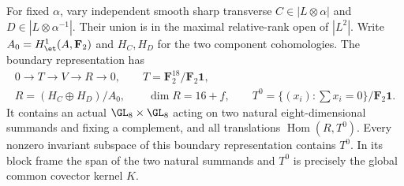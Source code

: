 \begin{lemma}
\label{lem:nonordinary-ppav-two-boundary-gluing-candidate}
For fixed $\alpha$, vary independent smooth sharp transverse
$C\in|L\otimes\alpha|$ and $D\in|L\otimes\alpha^{-1}|$.
Their union is in the maximal relative-rank open of $|L^2|$.
Write $A_0=H^1_{\et}(A,\mathbf F_2)$ and $H_C,H_D$ for the two
component cohomologies. The boundary representation has
\[
 \begin{gathered}
 0\longrightarrow T\longrightarrow V\longrightarrow R\longrightarrow0,
 \qquad T=\mathbf F_2^{18}/\mathbf F_2\mathbf1,\\
 R=(H_C\oplus H_D)/A_0,
 \qquad \dim R=16+f,\qquad
 T^0=\{(x_i):\sum x_i=0\}/\mathbf F_2\mathbf1.
 \end{gathered}
\]
It contains an actual $\GL_8\times\GL_8$ acting on two natural
eight-dimensional summands and fixing a complement, and all
translations $\operatorname{Hom}(R,T^0)$. Every nonzero invariant
subspace of this boundary representation contains $T^0$.
In its block frame the span of the two natural summands and $T^0$
is precisely the global common covector kernel $K$.
\end{lemma}
